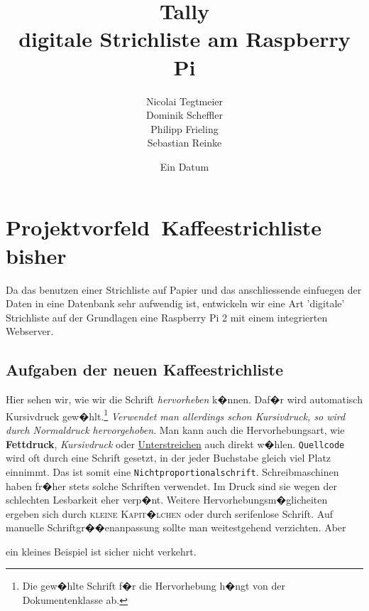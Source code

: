\documentclass[11pt,a4paper]{article} %
\title{Tally\\ digitale Strichliste am Raspberry Pi}
\author{Nicolai Tegtmeier \\ Dominik Scheffler \\ Philipp Frieling \\ Sebastian Reinke}
\date{Ein Datum}
\begin{document}

\maketitle  %



\section{Projektvorfeld\ Kaffeestrichliste bisher }
\label{Grundlagen}


Da das benutzen einer Strichliste auf Papier und das anschliessende einfuegen der Daten in eine Datenbank sehr aufwendig ist, entwickeln wir eine Art 'digitale' Strichliste auf der Grundlagen eine Raspberry Pi 2 mit einem integrierten Webserver.

\subsection{Aufgaben der neuen Kaffeestrichliste}
\label{SchriftAnpassen}

Hier sehen wir, wie wir die Schrift \emph{hervorheben} k�nnen. Daf�r wird automatisch Kursivdruck gew�hlt.\footnote{Die gew�hlte Schrift f�r die Hervorhebung h�ngt von der Dokumentenklasse ab.} \textit{Verwendet man allerdings schon Kursivdruck, so wird durch \emph{Normaldruck} hervorgehoben}. Man kann auch die Hervorhebungsart, wie \textbf{Fettdruck}, \textit{Kursivdruck} oder \underline{Unterstreichen} auch direkt w�hlen. \texttt{Quellcode} wird oft durch eine Schrift gesetzt, in der jeder Buchstabe gleich viel Platz einnimmt. Das ist somit eine \texttt{Nichtproportionalschrift}. Schreibmaschinen haben fr�her stets solche Schriften verwendet. Im Druck sind sie wegen der schlechten Lesbarkeit eher verp�nt. Weitere Hervorhebungsm�glicheiten ergeben sich durch \textsc{kleine Kapit�lchen} oder durch \textsf{serifenlose Schrift}. Auf manuelle Schriftgr��enanpassung sollte man weitestgehend verzichten. Aber \begin{tiny} ein kleines Beispiel ist sicher nicht verkehrt.\end{tiny}
\end{document}
